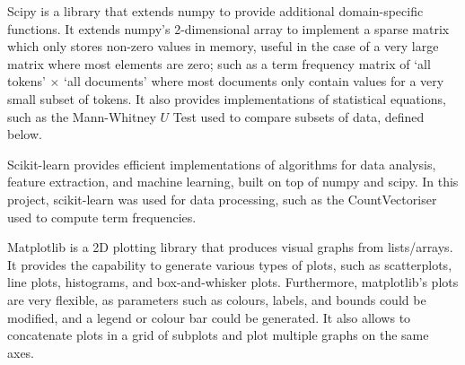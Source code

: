 \documentclass{report}
\begin{document}
Scipy \cite{Scipy} is a library that extends numpy to provide additional domain-specific functions. 
It extends numpy's 2-dimensional array to implement a sparse matrix which only stores non-zero values in memory, useful in the case of a very large matrix where most elements are zero; such as a term frequency matrix of `all tokens' $\times$ `all documents' where most documents only contain values for a very small subset of tokens.
It also provides implementations of statistical equations, such as the Mann-Whitney $U$ Test used to compare subsets of data, defined below. 

Scikit-learn \cite{Scikit-learn} provides efficient implementations of algorithms for data analysis, feature extraction, and machine learning, built on top of numpy and scipy.
In this project, scikit-learn was used for data processing, such as the CountVectoriser used to compute term frequencies.

Matplotlib \cite{Matplotlib} is a 2D plotting library that produces visual graphs from lists/arrays.
It provides the capability to generate various types of plots, such as scatterplots, line plots, histograms, and box-and-whisker plots.
Furthermore, matplotlib's plots are very flexible, as parameters such as colours, labels, and bounds could be modified, and a legend or colour bar could be generated.
It also allows to concatenate plots in a grid of subplots and plot multiple graphs on the same axes.
\end{document}
